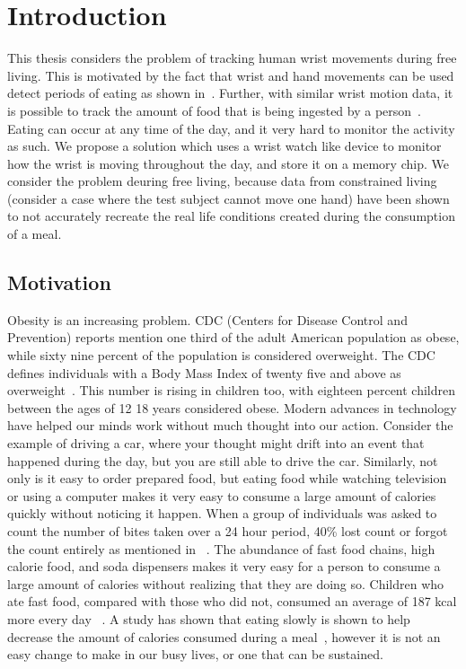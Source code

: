 
\chapter{Introduction}
\label{Chap:Intro}
This thesis considers the problem of tracking human wrist movements during free living.
This is motivated by the fact that wrist and hand movements can be used detect periods of eating
as shown in~\cite{dong2013detecting}. Further, with similar wrist motion data,
it is possible to track the amount of food that is being ingested by a person~\cite{dong2012new}.
Eating can occur at any time of the day, and it very hard to monitor the activity as such.
We propose a solution which uses a wrist watch like device to monitor how the wrist is moving throughout the day,
and store it on a memory chip. We consider the problem deuring free living,
because data from constrained living (consider a case where the test subject cannot move one hand)
have been shown to not accurately recreate the real life conditions created during the consumption of a meal.
\section{Motivation}
\label{Sec:Motivation}

 Obesity is an increasing problem. CDC (Centers for Disease Control and Prevention) reports mention one
 \textemdash{} third of the adult American population as 
 obese, while sixty nine percent of the population is considered 
 overweight. The CDC defines individuals with a Body Mass
 Index of twenty five and above as overweight~\cite{ogden2010prevalence}.
 This number is rising in children too, with eighteen
 percent children between the ages of 12 \textemdash{} 18
 years considered obese. Modern advances in technology
 have helped our minds work without much thought into our action.
 Consider the example of driving a car, where your thought might drift
 into an event that happened during the day, but you are still able to drive the car.
 Similarly, not only is it easy to order prepared food, but eating
 food while watching television or using a computer makes
 it very easy to consume a large amount of calories quickly without
 noticing it happen. When a group
 of individuals was asked to count the number of bites taken over
 a 24 hour period, 40\% lost count or forgot the count entirely as mentioned in ~\cite{mahoney1975obese}.
 The abundance of fast food chains, high calorie food, and soda dispensers makes it very easy
 for a person to consume a large amount of calories without realizing 
 that they are doing so. Children who ate fast food, compared with those who did not,
 consumed an average of 187 kcal more every day ~\cite{bowman2004effects}.
 A study has shown that eating slowly is shown to help decrease the amount of calories
 consumed during a meal~\cite{Andrade2008}, however it is not an
 easy change to make in our busy lives, or one that can be sustained.

